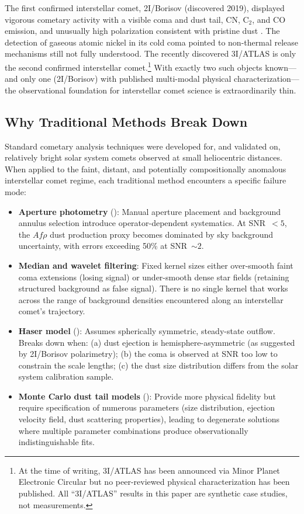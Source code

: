\documentclass[preprint2]{aastex631}
\begin{document}
The first confirmed interstellar comet, 2I/Borisov (discovered 2019), displayed vigorous cometary activity with a visible coma and dust tail, CN, C$_2$, and CO emission, and unusually high polarization consistent with pristine dust \citep{guzik19,jewitt19,fitzsimmons19,bodewits20,bagnulo22}. The detection of gaseous atomic nickel in its cold coma \citep{guzik21} pointed to non-thermal release mechanisms still not fully understood. The recently discovered 3I/ATLAS is only the second confirmed interstellar comet.\footnote{At the time of writing, 3I/ATLAS has been announced via Minor Planet Electronic Circular but no peer-reviewed physical characterization has been published. All ``3I/ATLAS'' results in this paper are synthetic case studies, not measurements.} With exactly two such objects known---and only one (2I/Borisov) with published multi-modal physical characterization---the observational foundation for interstellar comet science is extraordinarily thin.

\subsection{Why Traditional Methods Break Down}

Standard cometary analysis techniques were developed for, and validated on, relatively bright solar system comets observed at small heliocentric distances. When applied to the faint, distant, and potentially compositionally anomalous interstellar comet regime, each traditional method encounters a specific failure mode:

\begin{itemize}
    \item \textbf{Aperture photometry} (\citealt{lamy04}): Manual aperture placement and background annulus selection introduce operator-dependent systematics. At SNR~$< 5$, the $Af\rho$ dust production proxy \citep{ahearn95} becomes dominated by sky background uncertainty, with errors exceeding 50\% at SNR~$\sim 2$.
    \item \textbf{Median and wavelet filtering}: Fixed kernel sizes either over-smooth faint coma extensions (losing signal) or under-smooth dense star fields (retaining structured background as false signal). There is no single kernel that works across the range of background densities encountered along an interstellar comet's trajectory.
    \item \textbf{Haser model} (\citealt{haser57}): Assumes spherically symmetric, steady-state outflow. Breaks down when: (a) dust ejection is hemisphere-asymmetric (as suggested by 2I/Borisov polarimetry); (b) the coma is observed at SNR too low to constrain the scale lengths; (c) the dust size distribution differs from the solar system calibration sample.
    \item \textbf{Monte Carlo dust tail models} (\citealt{fulle10}): Provide more physical fidelity but require specification of numerous parameters (size distribution, ejection velocity field, dust scattering properties), leading to degenerate solutions where multiple parameter combinations produce observationally indistinguishable fits.
\end{itemize}
\end{document}
